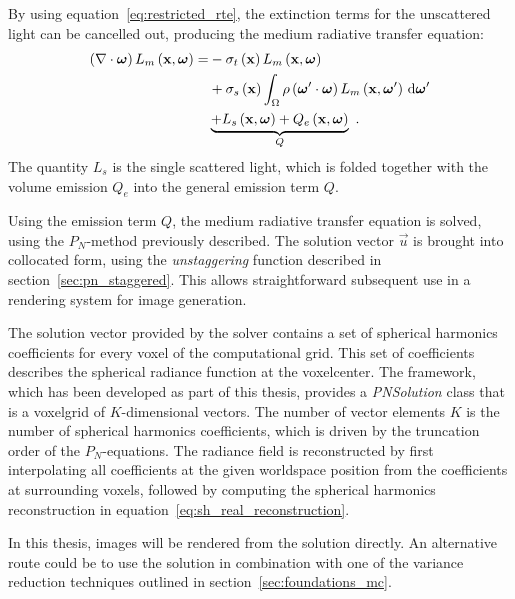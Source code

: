 By using equation~\ref{eq:restricted_rte}, the extinction terms for the unscattered light can be cancelled out, producing the medium radiative transfer equation:
\begin{align}
\left(\nabla\cdot\boldsymbol{\mathbf{\omega}}\right)L_m\left(\boldsymbol{\mathbf{x}}, \boldsymbol{\mathbf{\omega}} \right)
=&
-\sigma_t\left(\boldsymbol{\mathbf{x}}\right) L_m\left(\boldsymbol{\mathbf{x}}, \boldsymbol{\mathbf{\omega}} \right)\nonumber\\
&
+\sigma_s\left(\boldsymbol{\mathbf{x}}\right) \int_{\Omega}
{
\rho\left(\boldsymbol{\mathbf{\omega}}'\cdot\boldsymbol{\mathbf{\omega}}\right)L_m\left(\boldsymbol{\mathbf{x}}, \boldsymbol{\mathbf{\omega}}' \right)\,\mathrm{d}\boldsymbol{\mathbf{\omega}}'
}
\nonumber
\\
&
\underbrace
{
+L_s\left(\boldsymbol{\mathbf{x}}, \boldsymbol{\mathbf{\omega}}\right)
+Q_e\left(\boldsymbol{\mathbf{x}}, \boldsymbol{\mathbf{\omega}}\right)
}_{Q}
\nonumber
\  .
\end{align}
The quantity $L_s$ is the single scattered light, which is folded together with the volume emission $Q_e$ into the general emission term $Q$.

Using the emission term $Q$, the medium radiative transfer equation is solved, using the $P_N$-method previously described. The solution vector $\vec{u}$ is brought into collocated form, using the \emph{unstaggering} function described in section~\ref{sec:pn_staggered}. This allows straightforward subsequent use in a rendering system for image generation. 

The solution vector provided by the solver contains a set of spherical harmonics coefficients for every voxel of the computational grid. This set of coefficients describes the spherical radiance function at the voxelcenter. The framework, which has been developed as part of this thesis, provides a \emph{PNSolution} class that is a voxelgrid of $K$-dimensional vectors. The number of vector elements $K$ is the number of spherical harmonics coefficients, which is driven by the truncation order of the $P_N$-equations. The radiance field is reconstructed by first interpolating all coefficients at the given worldspace position from the coefficients at surrounding voxels, followed by computing the spherical harmonics reconstruction in equation~\ref{eq:sh_real_reconstruction}.

In this thesis, images will be rendered from the solution directly. An alternative route could be to use the solution in combination with one of the variance reduction techniques outlined in section~\ref{sec:foundations_mc}.

